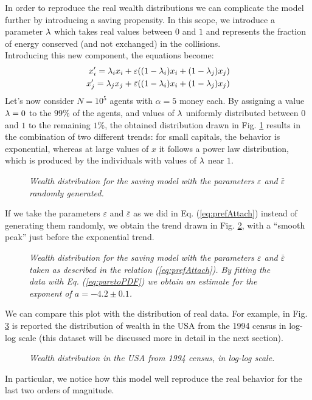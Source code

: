 In order to reproduce the real wealth distributions we can complicate the model further by introducing a saving propensity.
In this scope, we introduce a parameter $\lambda$ which takes real values between $0$ and $1$ and represents the fraction of energy conserved (and not exchanged) in the collisions. \\
Introducing this new component, the equations become:
\begin{equation}
	\begin{split}
		x'_i = \lambda_ix_i + \varepsilon((1-\lambda_i)x_i + (1-\lambda_j)x_j) 	\\
		x'_j = \lambda_jx_j + \bar{\varepsilon}((1-\lambda_i)x_i + (1-\lambda_j)x_j) 	\\
	\end{split}
\end{equation}
Let's now consider $N = 10^5$ agents with $\alpha = 5$ money each.
By assigning a value $\lambda = 0$ to the $99 \%$ of the agents, and values of $\lambda$ uniformly distributed between $0$ and $1$ to the remaining $1\%$, the obtained distribution drawn in Fig. \ref{fig:savings} results in the combination of two different trends: for small capitals, the behavior is exponential, whereas at large values of $x$ it follows a power law distribution, which is produced by the individuals with values of $\lambda$ near $1$.
\begin{figure}[H]
    \centering
    \scalebox{.7}{}
    \caption{\emph{Wealth distribution for the saving model with the parameters $\varepsilon$ and $\bar{\varepsilon}$ randomly generated.}}
    \label{fig:savings}
\end{figure}
If we take the parameters $\varepsilon$ and $\bar{\varepsilon}$ as we did in Eq. (\ref{eq:prefAttach}) instead of generating them randomly, we obtain the trend drawn in Fig. \ref{fig:savingsPref}, with a ``smooth peak'' just before the exponential trend.
\begin{figure}[H]
    \centering
    \scalebox{.7}{}
    \caption{\emph{Wealth distribution for the saving model with the parameters $\varepsilon$ and $\bar{\varepsilon}$ taken as described in the relation (\ref{eq:prefAttach}). By fitting the data with Eq. (\ref{eq:paretoPDF}) we obtain an estimate for the exponent of $a = -4.2 \pm 0.1$.}}
    \label{fig:savingsPref}
\end{figure}
We can compare this plot with the distribution of real data.
For example, in Fig. \ref{fig:savingsLog} is reported the distribution of wealth in the USA from the 1994 census in log-log scale (this dataset will be discussed more in detail in the next section).
\begin{figure}[H]
    \centering
    \scalebox{.7}{}
    \caption{\emph{Wealth distribution in the USA from 1994 census, in log-log scale.}}
    \label{fig:savingsLog}
\end{figure}
In particular, we notice how this model well reproduce the real behavior for the last two orders of magnitude.

